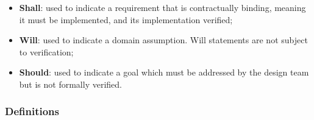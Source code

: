 \begin{itemize}
    \item \textbf{Shall}: used to indicate a requirement that is contractually binding, meaning it must be implemented, and its implementation verified;
    \item \textbf{Will}: used to indicate a domain assumption.  Will statements are not subject to verification;
    \item \textbf{Should}: used to indicate a goal which must be addressed by the design team but is not formally verified.
\end{itemize}

\subsubsection{Definitions}
